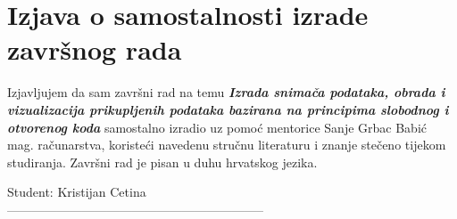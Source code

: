 \chapter*{Izjava o samostalnosti izrade završnog rada}
Izjavljujem da sam završni rad na temu \textbf{\emph{Izrada snimača podataka, obrada i vizualizacija prikupljenih podataka bazirana na principima slobodnog i otvorenog koda}} samostalno izradio uz pomoć mentorice Sanje Grbac Babić mag. računarstva, koristeći navedenu stručnu literaturu i znanje stečeno tijekom studiranja.
Završni rad je pisan u duhu hrvatskog jezika.
\vspace{\fill}
\begin{flushright}
Student: Kristijan Cetina\\
\vspace{15mm}
--------------------------------------------------------------
\end{flushright}